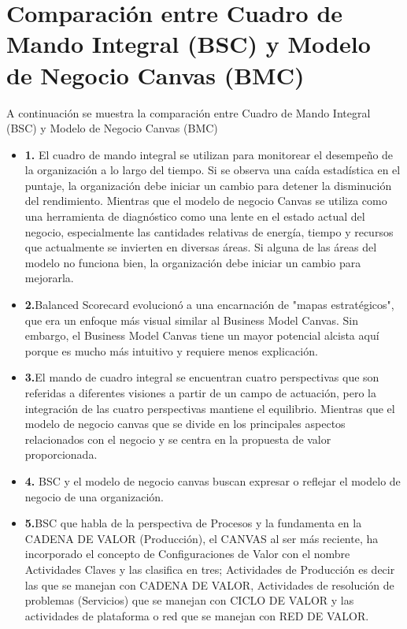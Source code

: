 \documentclass[preprint,12pt]{elsarticle}
\begin{document}



\section{Comparación entre Cuadro de Mando Integral (BSC) y Modelo de Negocio Canvas (BMC)}
A continuación se muestra la comparación entre Cuadro de Mando Integral (BSC) y Modelo de Negocio Canvas (BMC)
	
	\begin{itemize}

	\item{\textbf{1.}} El cuadro de mando integral se utilizan para monitorear el desempeño de la organización a lo largo del tiempo. Si se observa una caída estadística en el puntaje,
	 la organización debe iniciar un cambio para detener la disminución del rendimiento. Mientras que el  modelo de negocio Canvas se utiliza como una herramienta de diagnóstico como
 una lente en el estado actual del negocio, especialmente las cantidades relativas de energía, tiempo y recursos que actualmente se invierten en diversas áreas. Si alguna de las áreas del modelo no funciona bien, la organización debe iniciar un cambio para mejorarla.
	\item{\textbf{2.}}Balanced Scorecard evolucionó a una encarnación de "mapas estratégicos", que era un enfoque más visual similar al Business Model Canvas. Sin embargo, el Business Model Canvas tiene un mayor potencial alcista aquí porque es mucho más intuitivo y requiere menos explicación.
	\item{\textbf{3.}}El mando de cuadro integral se encuentran cuatro perspectivas que son referidas a diferentes visiones a partir de un campo de actuación, pero la integración de las cuatro perspectivas mantiene el equilibrio. Mientras que el modelo de negocio canvas que se divide en los principales aspectos relacionados con el negocio y se centra en la propuesta de valor proporcionada.
	\item{\textbf{4.}} BSC y el modelo de negocio canvas buscan expresar o reflejar el modelo de negocio de una organización.
	\item{\textbf{5.}}BSC que habla de la perspectiva de Procesos y la fundamenta en la CADENA DE VALOR (Producción), el CANVAS al ser más reciente, ha incorporado el concepto de Configuraciones de Valor con el nombre Actividades Claves y las clasifica en tres; Actividades de Producción es decir las que se manejan con CADENA DE VALOR, Actividades de resolución de problemas (Servicios) que se manejan con CICLO DE VALOR y las actividades de plataforma o red que se manejan con RED DE VALOR.

\end{itemize}
\end{document}
